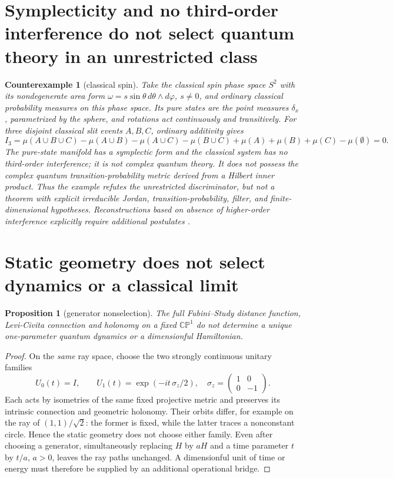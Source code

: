 \documentclass[11pt,a4paper]{article}
\newtheorem{proposition}[theorem]{Proposition}
\newtheorem{example}[theorem]{Counterexample}
\newcommand{\CP}{\mathbb{CP}}
\begin{document}
\section{Symplecticity and no third-order interference do not select quantum theory in an unrestricted class}
\begin{example}[classical spin]\label{ex:spin}
Take the classical spin phase space \(S^2\) with its nondegenerate area form \(\omega=s\sin\theta\,d\theta\wedge d\varphi\), \(s\neq0\), and ordinary classical probability measures on this phase space. Its pure states are the point measures \(\delta_x\), parametrized by the sphere, and rotations act continuously and transitively. For three disjoint classical slit events \(A,B,C\), ordinary additivity gives
\[
I_3=\mu(A\cup B\cup C)-\mu(A\cup B)-\mu(A\cup C)-\mu(B\cup C)
+\mu(A)+\mu(B)+\mu(C)-\mu(\emptyset)=0.
\]
The pure-state manifold has a symplectic form and the classical system has no third-order interference; it is not complex quantum theory. It does \emph{not} possess the complex quantum transition-probability metric derived from a Hilbert inner product. Thus the example refutes the \emph{unrestricted} discriminator, but not a theorem with explicit irreducible Jordan, transition-probability, filter, and finite-dimensional hypotheses. Reconstructions based on absence of higher-order interference explicitly require additional postulates \cite{barnum}.
\end{example}

\section{Static geometry does not select dynamics or a classical limit}
\begin{proposition}[generator nonselection]\label{prop:gen}
The full Fubini--Study distance function, Levi-Civita connection and holonomy on a fixed \(\CP^1\) do not determine a unique one-parameter quantum dynamics or a dimensionful Hamiltonian.
\end{proposition}
\begin{proof}
On the \emph{same} ray space, choose the two strongly continuous unitary families
\[
 U_0(t)=I,\qquad U_1(t)=\exp(-it\,\sigma_z/2),\quad
 \sigma_z=\begin{pmatrix}1&0\\0&-1\end{pmatrix}.
\]
Each acts by isometries of the same fixed projective metric and preserves its intrinsic connection and geometric holonomy. Their orbits differ, for example on the ray of \((1,1)/\sqrt2\): the former is fixed, while the latter traces a nonconstant circle. Hence the static geometry does not choose either family. Even after choosing a generator, simultaneously replacing \(H\) by \(aH\) and a time parameter \(t\) by \(t/a\), \(a>0\), leaves the ray paths unchanged. A dimensionful unit of time or energy must therefore be supplied by an additional operational bridge.
\end{proof}
\end{document}
